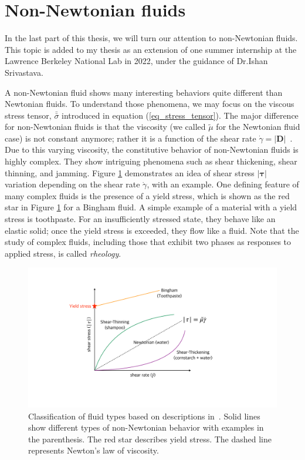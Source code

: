 \section{Non-Newtonian fluids}
\label{sec:intro_complex_fluid}
In the last part of this thesis, we will turn our attention to non-Newtonian fluids. This topic is added to my thesis as an extension of one summer internship at the Lawrence Berkeley National Lab in 2022, under the guidance of Dr.Ishan Srivastava. 
\par
\vphantom{text}
\par
A non-Newtonian fluid shows many interesting behaviors quite different than Newtonian fluids. To understand those phenomena, we may focus on the viscous stress tensor, $\bar{\bar{\sigma}}$ introduced in equation (\ref{eq_stress_tensor}). The major difference for non-Newtonian fluids is that the viscosity (we called $\tilde{\mu}$ for the Newtonian fluid case) is not constant anymore; rather it is a function of the shear rate $\dot{\gamma} = \left| {\boldsymbol{D}} \right|$~\cite{kundu_chapter_2016}.
Due to this varying viscosity, the constitutive behavior of non-Newtonian fluids is highly complex. 
They show intriguing phenomena such as shear thickening, shear thinning, and jamming. Figure \ref{fig_rheology} demonstrates an idea of shear stress $|\bm{\tau}|$ variation depending on the shear rate $\dot{\gamma}$, with an example.
One defining feature of many complex fluids is the presence of a yield stress, which is shown as the red star in Figure \ref{fig_rheology} for a Bingham fluid. A simple example of a material with a yield stress is toothpaste. For an insufficiently stressed state, they behave like an elastic solid; once the yield stress is exceeded, they flow like a fluid. Note that the study of complex fluids, including those that exhibit two phases as responses to applied stress, is called {\textit{rheology}}. 
\begin{figure}[h]
	\begin{center}
		\includegraphics[scale=0.25]{figures/fig_yield_stress_graph.pdf}
	\end{center}
   \caption{Classification of fluid types based on descriptions in~\cite{irgens_rheology_2014}. Solid lines show different types of non-Newtonian behavior with examples in the parenthesis. The red star describes yield stress. The dashed line represents Newton's law of viscosity.}
\label{fig_rheology}
\end{figure}
